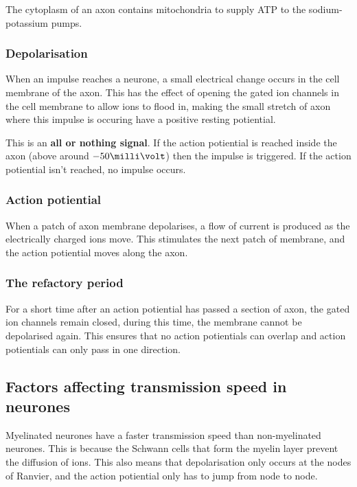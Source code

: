 \documentclass{article}
\begin{document}
The cytoplasm of an axon contains mitochondria to supply ATP to the sodium-
potassium pumps.

\subsubsection*{Depolarisation}

When an impulse reaches a neurone, a small electrical change occurs in the cell
membrane of the axon. This has the effect of opening the gated ion channels in
the cell membrane to allow ions to flood in, making the small stretch of axon
where this impulse is occuring have a positive resting potiential.

This is an {\bf all or nothing signal}. If the action potiential is reached
inside the axon (above around $-50\milli\volt$) then the impulse is triggered.
If the action potiential isn't reached, no impulse occurs.

\subsubsection*{Action potiential}

When a patch of axon membrane depolarises, a flow of current is produced as the
electrically charged ions move. This stimulates the next patch of membrane, and
the action potiential moves along the axon.

\subsubsection*{The refactory period}

For a short time after an action potiential has passed a section of axon, the
gated ion channels remain closed, during this time, the membrane cannot be
depolarised again. This ensures that no action potientials can overlap and
action potientials can only pass in one direction.

\subsection*{Factors affecting transmission speed in neurones}

Myelinated neurones have a faster transmission speed than non-myelinated
neurones. This is because the Schwann cells that form the myelin layer prevent
the diffusion of ions. This also means that depolarisation only occurs at the
nodes of Ranvier, and the action potiential only has to jump from node to node.
\end{document}
